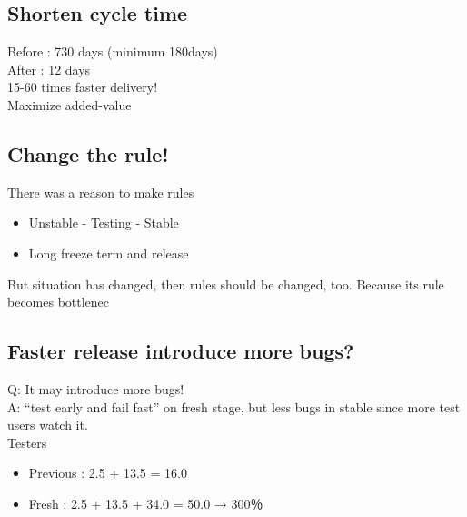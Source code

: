 \documentclass[mingoth,a4paper]{jsarticle}
\begin{document}
\subsection{Shorten cycle time}
\noindent
Before		: 730 days (minimum 180days)
\\
After		: 12 days
\\
15-60 times faster delivery!
\\
Maximize added-value

\subsection{Change the rule!}
\noindent
There was a reason to make rules
\begin{itemize}
 \item Unstable - Testing - Stable
 \item Long freeze term and release
\end{itemize}
But situation has changed, then rules should be changed, too. Because its rule becomes bottlenec

\subsection{Faster release introduce more bugs?}
\noindent
Q: It may introduce more bugs!\\
A: “test early and fail fast” on fresh stage, but less bugs in stable since more test users watch it.\\
Testers
\begin{itemize}
 \item Previous	: 2.5 + 13.5 = 16.0
 \item Fresh		: 2.5 + 13.5 + 34.0 = 50.0 → 300％
\end{itemize}
\end{document}

